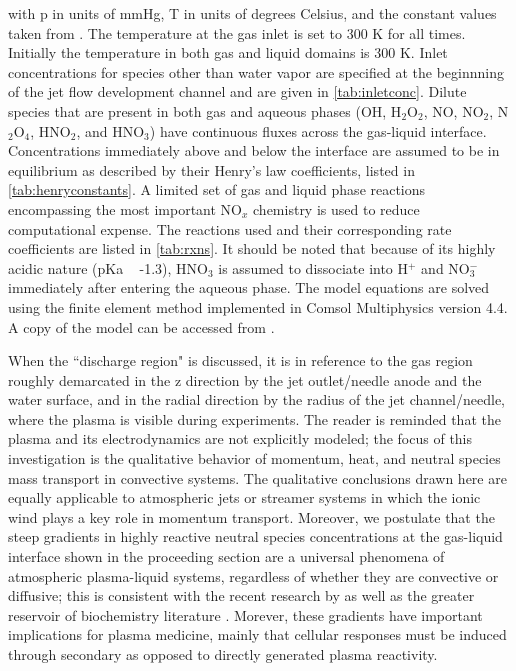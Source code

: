 \documentclass[12pt]{article}
\begin{document}
with p in units of mmHg, T in units of degrees Celsius, and the constant values taken from \cite{dimian2014integrated}.  The temperature at the gas inlet is set to 300 K for all times. Initially the temperature in both gas and liquid domains is 300 K. Inlet concentrations for species other than water vapor are specified at the beginnning of the jet flow development channel and are given in \cref{tab:inletconc}. Dilute species that are present in both gas and aqueous phases (OH, H$_2$O$_2$, NO, NO$_2$, N$_2$O$_4$, HNO$_2$, and HNO$_3$) have continuous fluxes across the gas-liquid interface. Concentrations immediately above and below the interface are assumed to be in equilibrium as described by their Henry's law coefficients, listed in \cref{tab:henryconstants}. A limited set of gas and liquid phase reactions encompassing the most important NO$_x$ chemistry is used to reduce computational expense. The reactions used and their corresponding rate coefficients are listed in \cref{tab:rxns}. It should be noted that because of its highly acidic nature (pKa ~ -1.3), HNO$_3$ is assumed to dissociate into H$^+$ and NO$_3^-$ immediately after entering the aqueous phase. The model equations are solved using the finite element method implemented in Comsol Multiphysics version 4.4. A copy of the model can be accessed from \cite{modelLocation}.

When the ``discharge region" is discussed, it is in reference to the gas region roughly demarcated in the z direction by the jet outlet/needle anode and the water surface, and in the radial direction by the radius of the jet channel/needle, where the plasma is visible during experiments. The reader is reminded that the plasma and its electrodynamics are not explicitly modeled; the focus of this investigation is the qualitative behavior of momentum, heat, and neutral species mass transport in convective systems. The qualitative conclusions drawn here are equally applicable to atmospheric jets or streamer systems in which the ionic wind plays a key role in momentum transport. Moreover, we postulate that the steep gradients in highly reactive neutral species concentrations at the gas-liquid interface shown in the proceeding section are a universal phenomena of atmospheric plasma-liquid systems, regardless of whether they are convective or diffusive; this is consistent with the recent research by \cite{Chen2014a} as well as the greater reservoir of biochemistry literature \cite{Halliwell}. Morever, these gradients have important implications for plasma medicine, mainly that cellular responses must be induced through secondary as opposed to directly generated plasma reactivity.  
\end{document}
